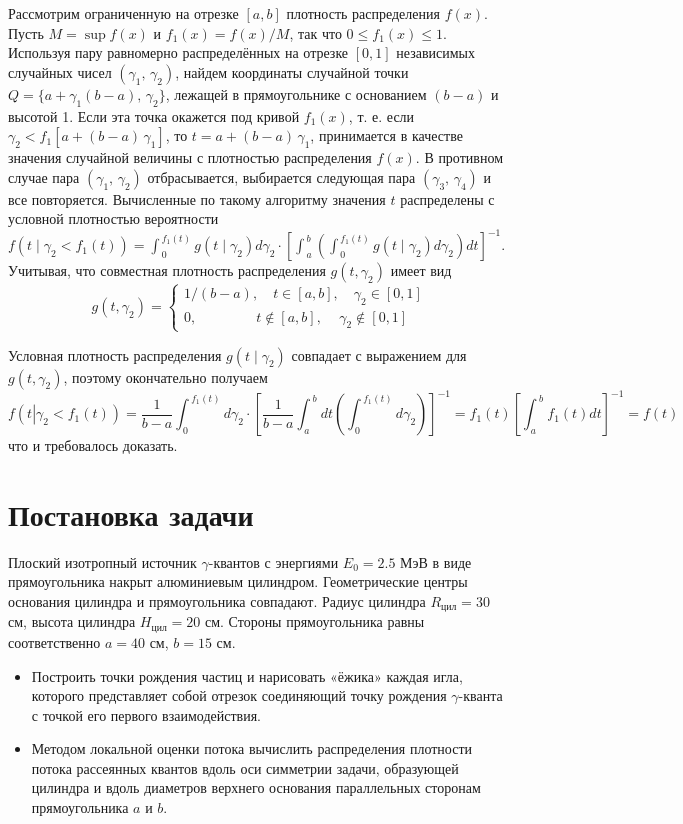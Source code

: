 \documentclass[
11pt,
master, %
subf, %
href, %
colorlinks=true, %
]{disser}
\begin{document}
Рассмотрим ограниченную на отрезке $[a,b]$ плотность распределения $f(x)$. Пусть $M=\sup f(x)$ и $f_{1} (x)=f(x)/M$, так что $0\le f_{1} (x)\le 1$. Используя пару равномерно распределённых на отрезке $[0,1]$  независимых случайных чисел $(\gamma _{1} ,\, \gamma _{2} )$, найдем координаты случайной точки $Q=\{ a+\gamma _{1} (b-a),\, \gamma _{2} \} $, лежащей в прямоугольнике с основанием $(b-a)$ и высотой 1. Если эта точка окажется под кривой $f_{1} (x)$, т. е. если $\gamma _{2} <f_{1} [a+(b-a)\, \gamma _{1} ]$, то $t=a+(b-a)\, \gamma _{1} $, принимается в качестве значения случайной величины  с плотностью распределения $f(x)$. В противном случае пара $(\gamma _{1} ,\, \gamma _{2} )$ отбрасывается, выбирается следующая пара $(\gamma _{3} ,\, \gamma _{4} )$ и все повторяется. Вычисленные по такому алгоритму значения $t$ распределены с условной плотностью вероятности
$f(t \mid \gamma _{2} <f_{1} (t))=\int _{\, 0}^{\, f_{1} (t)}g(t \mid \gamma _{2})d\gamma _{2}  \cdot \left[\int _{\, a}^{\, b}\left(\int _{\, 0}^{\, f_{1} (t)}g(t \mid \gamma _{2})d\gamma _{2}  \right) dt\right]^{-1}.$  Учитывая, что совместная плотность распределения  $g(t,\gamma _{2} )$ имеет вид
$$g(t,\gamma _{2} )=\left\{\begin{array}{l} {1/(b-a),\quad t\in [a,b],\quad \gamma _{2} \in [0,1]} \\ {0,\quad \quad \quad \quad~ t\notin [a,b],\quad \, \gamma _{2} \notin [0,1]} \end{array}\right.$$

Условная плотность распределения $g(t \mid \gamma _{2})$ совпадает с выражением для $g(t,\gamma _{2} )$, поэтому окончательно получаем
$$f(t\left|\gamma _{2} \right. <f_{1} (t))=\frac{1}{b-a}\int _{\, 0}^{\, f_{1} (t)}d\gamma _{2}  \cdot \left[\frac{1}{b-a}\int _{\, a}^{\, b}dt\left(\int _{\, 0}^{\, f_{1} (t)}d\gamma _{2}  \right) \right]^{-1} =f_{1} (t)\left[\int _{\, a}^{\, b}f_{1} (t) dt\right]^{-1} =f(t)$$
что и требовалось доказать.

\newpage
\section{Постановка задачи}
Плоский изотропный источник $\gamma$-квантов с энергиями $E_0 = 2.5$ МэВ в виде прямоугольника накрыт алюминиевым цилиндром. Геометрические центры основания цилиндра и прямоугольника совпадают. Радиус цилиндра $R_{\text{цил}} = 30$ см, высота цилиндра $H_{\text{цил}} = 20$ см. Стороны прямоугольника  равны соответственно $a = 40$ см, $b = 15$ см.
\begin{itemize}
\item Построить точки рождения частиц и нарисовать «ёжика» каждая игла, которого представляет собой отрезок соединяющий точку рождения $\gamma$-кванта с точкой его первого взаимодействия.
\item Методом локальной оценки потока вычислить распределения плотности потока рассеянных квантов вдоль оси симметрии задачи, образующей цилиндра и вдоль диаметров верхнего основания параллельных сторонам  прямоугольника $a$ и $b$.
\end{itemize}
\end{document}
